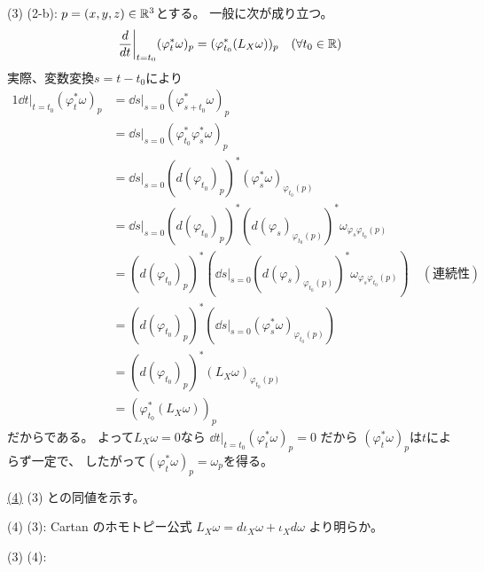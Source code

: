 \documentclass[report, notitlepage]{jlreq}
\begin{document}
\begin{answer}
    (3) \Rightarrow (2-b): \quad
    $p = (x, y, z) \in \mathbb{R}^3$とする。
    一般に次が成り立つ。
    \begin{equation}
        \dd{t}\bigg|_{t = t_0} (\varphi_t^* \omega)_p
            = (\varphi_{t_0}^* (L_X \omega))_p
            \quad
            (\forall t_0 \in \R)
    \end{equation}
    実際、変数変換$s = t - t_0$により
    \begin{alignat}{1}
        \dd{t}\bigg|_{t = t_0} (\varphi_t^* \omega)_p
            &= \dd{s}\bigg|_{s = 0}
                (\varphi_{s + t_0}^* \omega)_p \\
            &= \dd{s}\bigg|_{s = 0}
                (
                    \varphi_{t_0}^*
                    \varphi_{s}^*
                    \omega
                )_p \\
            &= \dd{s}\bigg|_{s = 0}
                (d(\varphi_{t_0})_p)^*
                (
                    \varphi_{s}^*
                    \omega
                )_{\varphi_{t_0} (p)} \\
            &= \dd{s}\bigg|_{s = 0}
                (d(\varphi_{t_0})_p)^*
                (d(\varphi_{s})_{\varphi_{t_0} (p)})^*
                \omega_{\varphi_s \varphi_{t_0} (p)} \\
            &= (d(\varphi_{t_0})_p)^*
                \left(
                    \dd{s}\bigg|_{s = 0}
                    (d(\varphi_{s})_{\varphi_{t_0} (p)})^*
                    \omega_{\varphi_s \varphi_{t_0} (p)}
                \right)
                \quad
                (\text{連続性}) \\
            &= (d(\varphi_{t_0})_p)^*
                \left(
                    \dd{s}\bigg|_{s = 0}
                    (\varphi_s^* \omega)_{\varphi_{t_0} (p)}
                \right) \\
            &= (d(\varphi_{t_0})_p)^*
                (L_X \omega)_{\varphi_{t_0} (p)} \\
            &= (\varphi_{t_0}^* (L_X \omega))_p
    \end{alignat}
    だからである。
    よって$L_X \omega = 0$なら
    $\dd{t}\bigg|_{t = t_0} (\varphi_t^* \omega)_p = 0$
    だから
    $(\varphi_t^* \omega)_p$は$t$によらず一定で、
    したがって$(\varphi_t^* \omega)_p = \omega_p$を得る。

    \uline{(4)} \quad
    (3) との同値を示す。

    (4) \Rightarrow (3): \quad
    Cartan のホモトピー公式
    $L_X \omega = d \iota_X \omega + \iota_X d \omega$
    より明らか。

    (3) \Rightarrow (4): \quad

\end{answer}
\end{document}
